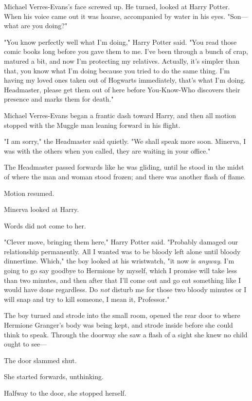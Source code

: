 Michael Verres-Evans's face screwed up. He turned, looked at Harry Potter. When
his voice came out it was hoarse, accompanied by water in his eyes. "Son---what
are you doing?"

"You know perfectly well what I'm doing," Harry Potter said. "You read those
comic books long before you gave them to me. I've been through a bunch of crap,
matured a bit, and now I'm protecting my relatives. Actually, it's simpler than
that, you know what I'm doing because you tried to do the same thing. I'm
having my loved ones taken out of Hogwarts immediately, that's what I'm doing.
Headmaster, please get them out of here before You-Know-Who discovers their
presence and marks them for death."

Michael Verres-Evans began a frantic dash toward Harry, and then all motion
stopped with the Muggle man leaning forward in his flight.

"I am sorry," the Headmaster said quietly. "We shall speak more soon. Minerva,
I was with the others when you called, they are waiting in your office."

The Headmaster passed forwards like he was gliding, until he stood in the midst
of where the man and woman stood frozen; and there was another flash of flame.

Motion resumed.

Minerva looked at Harry.

Words did not come to her.

"Clever move, bringing them here," Harry Potter said. "Probably damaged our
relationship permanently. All I wanted was to be bloody left alone until bloody
dinnertime. Which," the boy looked at his wristwatch, "it now is \emph{anyway}.
I'm going to go say goodbye to Hermione by myself, which I promise will take
less than two minutes, and then after that I'll come out and go eat something
like I would have done regardless. Do \emph{not} disturb me for those two
bloody minutes or I will snap and try to kill someone, I mean it, Professor."

The boy turned and strode into the small room, opened the rear door to where
Hermione Granger's body was being kept, and strode inside before she could
think to speak. Through the doorway she saw a flash of a sight she knew no
child ought to see---

The door slammed shut.

She started forwards, unthinking.

Halfway to the door, she stopped herself.

